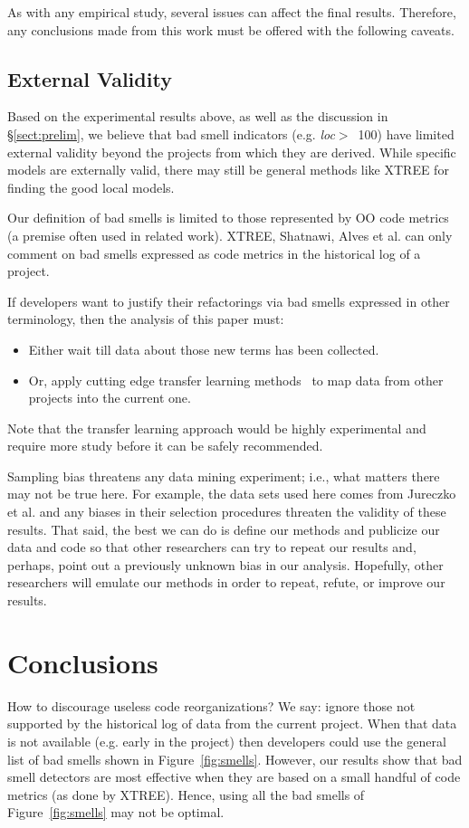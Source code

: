 \documentclass[twocolumn,5p]{elsarticle}
\newcommand{\tion}[1]{\S\ref{sect:#1}}
\newcommand{\fig}[1]{Figure~\ref{fig:#1}}
\theoremstyle{break}
\begin{document}
\begin{itemize}
As with any empirical study, several issues can affect the final results. Therefore, any
conclusions made from this work must be offered with the following
caveats.
		
\subsection{External Validity}
Based on the experimental results above,
as well as the discussion in \tion{prelim},
we believe that bad smell indicators (e.g. \mbox{{\em loc}$>$ 100})
have limited external validity beyond the projects from which they are derived. 
While specific models are externally valid,
there may still be general methods like XTREE for finding the good local models.  


Our definition of bad smells is limited to those represented by OO code metrics (a premise often used in related work).   
XTREE, Shatnawi, Alves et al. can  only comment
on bad smells   expressed as code metrics 
in the historical log of a project. 


If developers want to justify their refactorings
via bad smells expressed in other terminology,
then the  analysis of this paper must:
\begin{itemize}
	\item Either wait till 
	data about those new
	terms has been collected. 
	\item Or, apply cutting edge transfer learning
	methods~\cite{Nam15,Jing15} to map data from other projects
	into the current one.
	\end{itemize}
	Note that the transfer learning approach would
	be highly experimental and require more study
	before it can be safely recommended.
	
	Sampling bias threatens any data mining experiment; i.e., what matters
	there may not be true here. For example, the data sets used here comes from Jureczko et al. and any biases in their selection procedures
	threaten the validity of these results. 
	That said,
	the best we can do is define our methods and publicize our data and code so that other researchers can
	try to repeat our results and, perhaps, point out a previously unknown bias
	in our analysis. Hopefully, other researchers will emulate our methods in
	order to repeat, refute, or improve our results. 

		
		\section{Conclusions}
		How to discourage useless code reorganizations?
		We say: ignore those not supported by the historical log of data from
		the current project.  
		When that data is not available (e.g. early
		in the project) then developers could use the general list of
		bad smells shown in \fig{smells}. However, 
		our results
		show that  bad smell detectors are most
		effective when they are based
		on a small handful of code metrics (as done by XTREE).
		Hence, using all the bad smells of \fig{smells} may not be optimal. 
		

\end{itemize}
\end{document}
